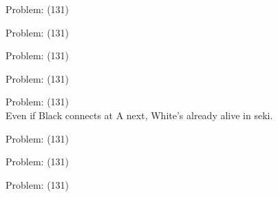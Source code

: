 \documentclass[11pt]{article}
\begin{document}
\begin{minipage}[t]{0.5\textwidth}
  {\centering
  
  Problem: (131)\\
  
  }
\end{minipage}
\begin{minipage}[t]{0.5\textwidth}
  {\centering
  
  Problem: (131)\\
  
  }
\end{minipage}
\begin{minipage}[t]{0.5\textwidth}
  {\centering
  
  Problem: (131)\\
  
  }
\end{minipage}
\begin{minipage}[t]{0.5\textwidth}
  {\centering
  
  Problem: (131)\\
  
  }
\end{minipage}
\begin{minipage}[t]{0.5\textwidth}
  {\centering
  
  Problem: (131)\\
  Even if Black connects at A next, White's already alive in seki.\\
  }
\end{minipage}
\begin{minipage}[t]{0.5\textwidth}
  {\centering
  
  Problem: (131)\\
  
  }
\end{minipage}
\begin{minipage}[t]{0.5\textwidth}
  {\centering
  
  Problem: (131)\\
  
  }
\end{minipage}
\begin{minipage}[t]{0.5\textwidth}
  {\centering
  
  Problem: (131)\\
  
  }
\end{minipage}
\end{document}
